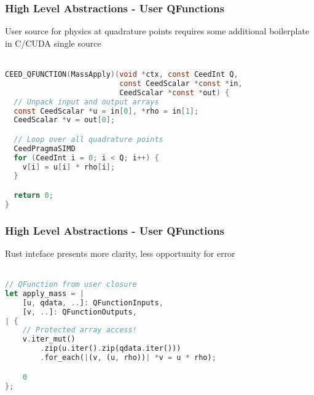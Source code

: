 \documentclass{beamer}
\begin{document}

\begin{frame}[fragile]
\begin{center}
\frametitle{High Level Abstractions - User QFunctions}

User source for physics at quadrature points requires some additional boilerplate in C/CUDA single source\\

~\\

{\footnotesize
\begin{lstlisting}[language=C, style=boxedC]
CEED_QFUNCTION(MassApply)(void *ctx, const CeedInt Q,
                          const CeedScalar *const *in,
                          CeedScalar *const *out) {
  // Unpack input and output arrays
  const CeedScalar *u = in[0], *rho = in[1];
  CeedScalar *v = out[0];

  // Loop over all quadrature points
  CeedPragmaSIMD
  for (CeedInt i = 0; i < Q; i++) {
    v[i] = u[i] * rho[i];
  }

  return 0;
}
\end{lstlisting}
}

\end{center}
\end{frame}


\begin{frame}[fragile]
\begin{center}
\frametitle{High Level Abstractions - User QFunctions}

Rust inteface presents more clarity, less opportunity for error\\

~\\

{\footnotesize
\begin{lstlisting}[language=Rust, style=boxedRust]
// QFunction from user closure
let apply_mass = |
    [u, qdata, ..]: QFunctionInputs,
    [v, ..]: QFunctionOutputs,
| {
    // Protected array access!
    v.iter_mut()
        .zip(u.iter().zip(qdata.iter()))
        .for_each(|(v, (u, rho))| *v = u * rho);

    0
};
\end{lstlisting}
}

\end{center}
\end{frame}
\end{document}

